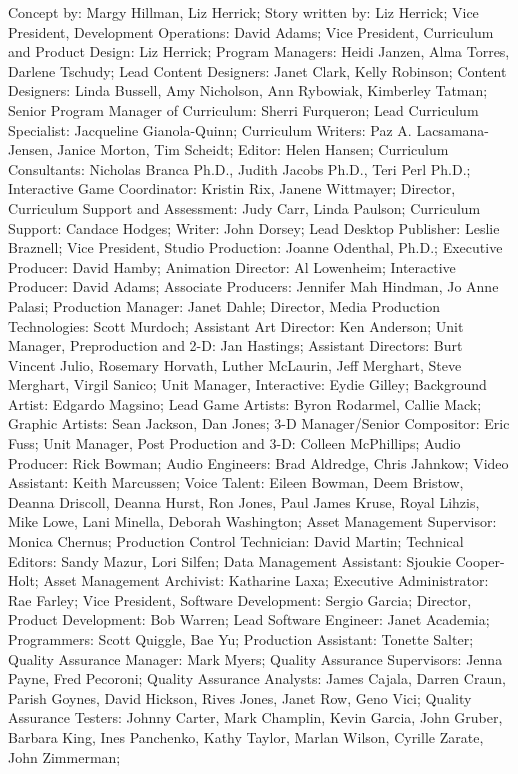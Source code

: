 Concept by: Margy Hillman, Liz Herrick;
Story written by: Liz Herrick;
Vice President, Development Operations: David Adams;
Vice President, Curriculum and Product Design: Liz Herrick;
Program Managers: Heidi Janzen, Alma Torres, Darlene Tschudy;
Lead Content Designers: Janet Clark, Kelly Robinson;
Content Designers: Linda Bussell, Amy Nicholson, Ann Rybowiak, Kimberley Tatman;
Senior Program Manager of Curriculum: Sherri Furqueron;
Lead Curriculum Specialist: Jacqueline Gianola-Quinn;
Curriculum Writers: Paz A. Lacsamana-Jensen, Janice Morton, Tim Scheidt;
Editor: Helen Hansen;
Curriculum Consultants: Nicholas Branca Ph.D., Judith Jacobs Ph.D., Teri Perl Ph.D.;
Interactive Game Coordinator: Kristin Rix, Janene Wittmayer;
Director, Curriculum Support and Assessment: Judy Carr, Linda Paulson;
Curriculum Support: Candace Hodges;
Writer: John Dorsey;
Lead Desktop Publisher: Leslie Braznell;
Vice President, Studio Production: Joanne Odenthal, Ph.D.;
Executive Producer: David Hamby;
Animation Director: Al Lowenheim;
Interactive Producer: David Adams;
Associate Producers: Jennifer Mah Hindman, Jo Anne Palasi;
Production Manager: Janet Dahle;
Director, Media Production Technologies: Scott Murdoch;
Assistant Art Director: Ken Anderson;
Unit Manager, Preproduction and 2-D: Jan Hastings;
Assistant Directors: Burt Vincent Julio, Rosemary Horvath, Luther McLaurin, Jeff Merghart, Steve Merghart, Virgil Sanico;
Unit Manager, Interactive: Eydie Gilley;
Background Artist: Edgardo Magsino;
Lead Game Artists: Byron Rodarmel, Callie Mack;
Graphic Artists: Sean Jackson, Dan Jones;
3-D Manager/Senior Compositor: Eric Fuss;
Unit Manager, Post Production and 3-D: Colleen McPhillips;
Audio Producer: Rick Bowman;
Audio Engineers: Brad Aldredge, Chris Jahnkow;
Video Assistant: Keith Marcussen;
Voice Talent: Eileen Bowman, Deem Bristow, Deanna Driscoll, Deanna Hurst, Ron Jones, Paul James Kruse, Royal Lihzis, Mike Lowe, Lani Minella, Deborah Washington;
Asset Management Supervisor: Monica Chernus;
Production Control Technician: David Martin;
Technical Editors: Sandy Mazur, Lori Silfen;
Data Management Assistant: Sjoukie Cooper-Holt;
Asset Management Archivist: Katharine Laxa;
Executive Administrator: Rae Farley;
Vice President, Software Development: Sergio Garcia;
Director, Product Development: Bob Warren;
Lead Software Engineer: Janet Academia;
Programmers: Scott Quiggle, Bae Yu;
Production Assistant: Tonette Salter;
Quality Assurance Manager: Mark Myers;
Quality Assurance Supervisors: Jenna Payne, Fred Pecoroni;
Quality Assurance Analysts: James Cajala, Darren Craun, Parish Goynes, David Hickson, Rives Jones, Janet Row, Geno Vici;
Quality Assurance Testers: Johnny Carter, Mark Champlin, Kevin Garcia, John Gruber, Barbara King, Ines Panchenko, Kathy Taylor, Marlan Wilson, Cyrille Zarate, John Zimmerman;

